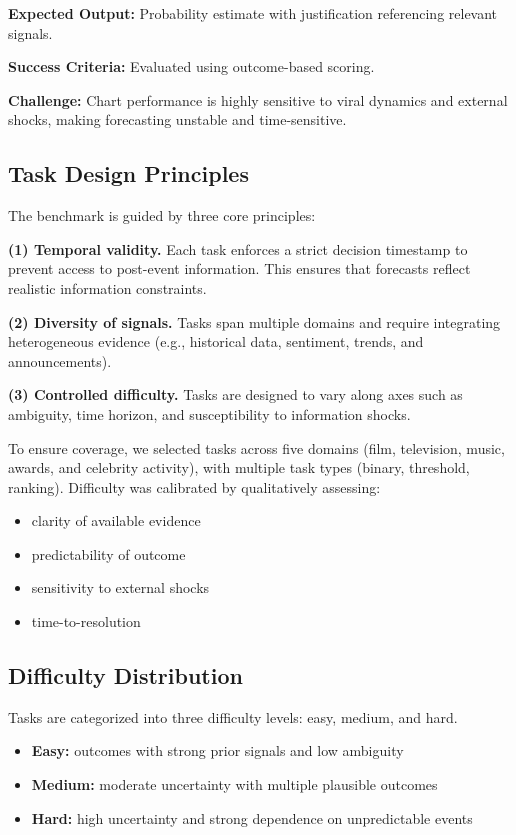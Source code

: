 \documentclass{article} %
\begin{document}
\textbf{Expected Output:}
Probability estimate with justification referencing relevant signals.

\textbf{Success Criteria:}
Evaluated using outcome-based scoring.

\textbf{Challenge:}
Chart performance is highly sensitive to viral dynamics and external shocks, making forecasting unstable and time-sensitive.

\subsection{Task Design Principles}

The benchmark is guided by three core principles:

\textbf{(1) Temporal validity.} Each task enforces a strict decision timestamp to prevent access to post-event information. This ensures that forecasts reflect realistic information constraints.

\textbf{(2) Diversity of signals.} Tasks span multiple domains and require integrating heterogeneous evidence (e.g., historical data, sentiment, trends, and announcements).

\textbf{(3) Controlled difficulty.} Tasks are designed to vary along axes such as ambiguity, time horizon, and susceptibility to information shocks.

To ensure coverage, we selected tasks across five domains (film, television, music, awards, and celebrity activity), with multiple task types (binary, threshold, ranking). Difficulty was calibrated by qualitatively assessing:
\begin{itemize}[noitemsep]
    \item clarity of available evidence
    \item predictability of outcome
    \item sensitivity to external shocks
    \item time-to-resolution
\end{itemize}

\subsection{Difficulty Distribution}

Tasks are categorized into three difficulty levels: easy, medium, and hard. 

\begin{itemize}[noitemsep]
    \item \textbf{Easy:} outcomes with strong prior signals and low ambiguity
    \item \textbf{Medium:} moderate uncertainty with multiple plausible outcomes
    \item \textbf{Hard:} high uncertainty and strong dependence on unpredictable events
\end{itemize}
\end{document}
